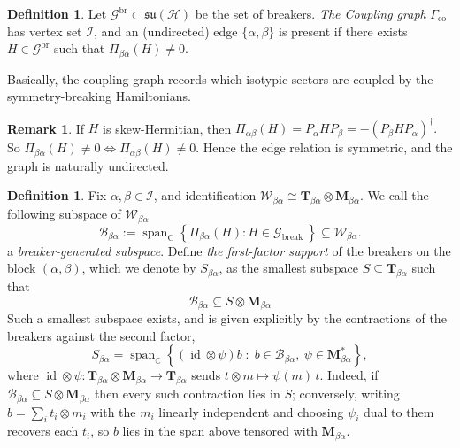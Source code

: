 \documentclass[11pt,letterpaper]{article}
\theoremstyle{plain}
\theoremstyle{plain}
\theoremstyle{plain}
\theoremstyle{plain}
\theoremstyle{plain}
\theoremstyle{plain}
\newcommand{\C}{\mathbb{C}}
\newcommand{\HH}{\mathcal{H}}
\theoremstyle{plain}
\theoremstyle{definition}
\newtheorem{smdefinition}[smtheorem]{Definition}
\newtheorem{smremark}[smtheorem]{Remark}
\theoremstyle{plain}
\begin{document}
\begin{smdefinition}\label{def:coupling_graph}
    Let $\mathcal{G}^{\text{br}} \subset \mathfrak{su}(\HH)$ be the set of breakers. \textit{The Coupling graph} $\Gamma_{\mathrm{co}}$ has vertex set $\mathcal{I}$, and an (undirected) edge $\{\alpha, \beta\}$ is present if there exists $H \in \mathcal{G}^{\text{br}}$ such that
$
\Pi_{\beta \alpha}(H) \neq 0 .
$    
\end{smdefinition}

Basically, the coupling graph records which isotypic sectors are coupled by the symmetry-breaking Hamiltonians.

\begin{smremark}
    If $H$ is skew-Hermitian, then
    $
    \Pi_{\alpha \beta}(H)=P_\alpha H P_\beta=-\left(P_\beta H P_\alpha\right)^{\dagger}.
    $
    So
    $
    \Pi_{\beta \alpha}(H) \neq 0 \Longleftrightarrow \Pi_{\alpha \beta}(H) \neq 0 .
    $
    Hence the edge relation is symmetric, and the graph is naturally undirected.
\end{smremark}

\begin{smdefinition}\label{def:breaker_generated_subspace}
    Fix $\alpha, \beta \in \mathcal{I}$, and identification
    $
    \mathcal{W}_{\beta \alpha} \cong \mathbf{T}_{\beta \alpha} \otimes \mathbf{M}_{\beta \alpha}.
    $
    We call the following subspace of $\mathcal{W}_{\beta \alpha}$ 
    $$
    \mathcal{B}_{\beta \alpha}:=\operatorname{span}_{\mathrm{C}}\left\{\Pi_{\beta \alpha}(H): H \in \mathcal{G}_{\text {break }}\right\} \subseteq \mathcal{W}_{\beta \alpha} .
    $$
    a \textit{breaker-generated subspace}. Define \textit{the first-factor support} of the breakers on the block $(\alpha, \beta)$, which we denote by $S_{\beta \alpha}$, as the smallest subspace $S \subseteq \mathbf{T}_{\beta \alpha}$ such that
    $$
    \mathcal{B}_{\beta \alpha} \subseteq S \otimes \mathbf{M}_{\beta \alpha}
    $$
    Such a smallest subspace exists, and is given explicitly by the contractions of the breakers against the second factor,
    $$
    S_{\beta\alpha}=\operatorname{span}_\C\left\{\left(\operatorname{id}\otimes\psi\right)b\;:\;b\in\mathcal B_{\beta\alpha},\ \psi\in\mathbf M_{\beta\alpha}^*\right\},
    $$
    where $\operatorname{id}\otimes\psi:\mathbf T_{\beta\alpha}\otimes\mathbf M_{\beta\alpha}\to\mathbf T_{\beta\alpha}$ sends $t\otimes m\mapsto\psi(m)\,t$. Indeed, if $\mathcal B_{\beta\alpha}\subseteq S\otimes\mathbf M_{\beta\alpha}$ then every such contraction lies in $S$; conversely, writing $b=\sum_i t_i\otimes m_i$ with the $m_i$ linearly independent and choosing $\psi_i$ dual to them recovers each $t_i$, so $b$ lies in the span above tensored with $\mathbf M_{\beta\alpha}$.
\end{smdefinition}
\end{document}
